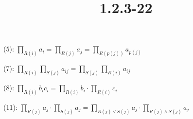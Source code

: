\documentclass{article}
\title{1.2.3-22}
\begin{document}
\maketitle

(5): \( \prod_{R(i)} a_i = \prod_{R(j)} a_j = \prod_{R(p(j))} a_{p(j)} \)

(7): \( \prod_{R(i)}\prod_{S(j)} a_{ij} = \prod_{S(j)}\prod_{R(i)} a_{ij} \)

(8): \( \prod_{R(i)} b_ic_i = \prod_{R(i)} b_i \cdot \prod_{R(i)} c_i \)

(11): \( \prod_{R(j)} a_j \cdot \prod_{S(j)} a_j = \prod_{R(j) \lor S(j)} a_j \cdot \prod_{R(j) \land S(j)} a_j \)
\end{document}
